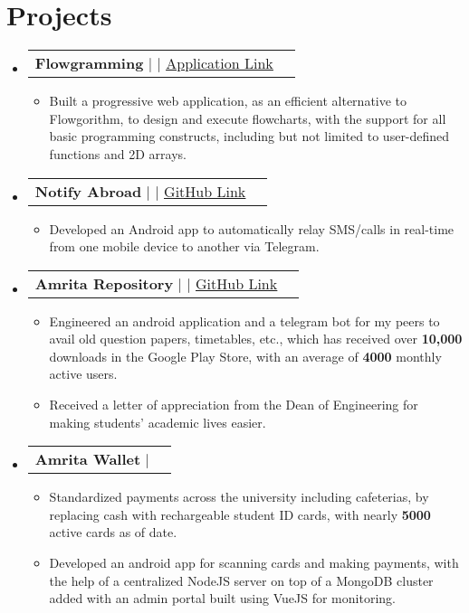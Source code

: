 \documentclass[letterpaper,11pt]{article}
\makeatletter
\newcommand{\resumeItem}[1]{
  \item\small{
    {#1 \vspace{-2pt}}
  }
}
\newcommand{\resumeProjectHeading}[2]{
    \item
    \begin{tabular*}{1.001\textwidth}{l@{\extracolsep{\fill}}r}
      \small#1 & \textbf{\small #2}\\
    \end{tabular*}\vspace{-7pt}
}
\newcommand{\resumeSubHeadingListStart}{\begin{itemize}[leftmargin=0.0in, label={}]}
\newcommand{\resumeSubHeadingListEnd}{\end{itemize}}
\newcommand{\resumeItemListStart}{\begin{itemize}}
\newcommand{\resumeItemListEnd}{\end{itemize}\vspace{-5pt}}
\makeatother
\begin{document}
\section{Projects}
    \vspace{-5pt}
    \resumeSubHeadingListStart
    \resumeProjectHeading
          {\textbf{Flowgramming} $|$ \text{HTML, Bootstrap, jQuery,  JointJS} $|$ \href{https://flowgrammers-org.github.io/flowgramming/}{\underline{Application Link}}}{}
          \resumeItemListStart
            \resumeItem{Built a progressive web application,  as an efficient alternative to Flowgorithm,  to design and execute flowcharts,  with the support for all basic programming constructs,  including but not limited to user-defined functions and 2D arrays.}
          \resumeItemListEnd 
          \vspace{-13pt}
    \resumeProjectHeading
          {\textbf{Notify Abroad} $|$ \text{Android, Java} $|$ \href{https://github.com/rajkumaar23/notify-abroad}{\underline{GitHub Link}}}{}
          \resumeItemListStart
            \resumeItem{Developed an Android app to automatically relay SMS/calls in real-time from one mobile device to another via Telegram.}
          \resumeItemListEnd 
         \vspace{-27pt}
      \resumeProjectHeading
          {\textbf{Amrita Repository} $|$ \text{Android, SQLite, Web Scraping, PHP, Python} $|$ \href{https://github.com/rajkumaar23/amrita-repository}{\underline {GitHub Link}}}{}
          \resumeItemListStart
            \resumeItem{Engineered an android application and a telegram bot for my peers to avail old question papers, timetables,  etc., which has received over \textbf{10,000} downloads in the Google Play Store,  with an average of \textbf{4000} monthly active users.}
            \resumeItem{Received a letter of appreciation from the Dean of Engineering for making students' academic lives easier.}
          \resumeItemListEnd
          \vspace{-13pt}
      \resumeProjectHeading
          {\textbf{Amrita Wallet} $|$ \text{Android, NodeJS, MongoDB, VueJS}}{}
          \resumeItemListStart
            \resumeItem{Standardized payments across the university including cafeterias, by replacing cash with rechargeable student ID cards,  with nearly \textbf{5000} active cards as of date.}          
            \resumeItem{Developed an android app for scanning cards and making payments,  with the help of a centralized NodeJS server on top of a MongoDB cluster added with an admin portal built using VueJS for monitoring.}
          \resumeItemListEnd 
    \resumeSubHeadingListEnd
\vspace{-10pt}
\end{document}
